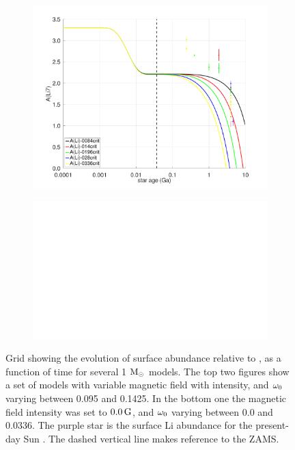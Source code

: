 \documentclass[fleqn,usenatbib]{mnras}
\begin{document}
\begin{figure}
\begin{subfigure}[h]{0.47\textwidth}
    \includegraphics[trim = 25mm 10mm 15mm 10mm, clip,width=\textwidth]{figures/paper2/li_var_vel_0_0g_0.pdf}
    \label{fig:subim13}
    \end{subfigure}
    \begin{subfigure}[h]{0.47\textwidth}
    \includegraphics[width=\textwidth]{figures/blank.eps}
    \label{fig:subim14}
    \end{subfigure}

\caption{Grid showing the evolution of surface  abundance relative to , as a function of time for several 1 $\mathrm{M}_\odot$ models. The top two figures show a set of models with variable magnetic field with intensity, and $\omega_{\mathrm{0}}$ varying between 0.095 and 0.1425. In the bottom one the magnetic field intensity was set to $0.0\,\mathrm{G}$, and $\omega_{\mathrm{0}}$ varying between 0.0 and 0.0336. The purple star is the surface Li abundance for the present-day Sun \citep{Asplund2009}. The dashed vertical line makes reference to the ZAMS.}
\label{fig:grid_li_var_vel}
\end{figure}
\par
\end{document}
